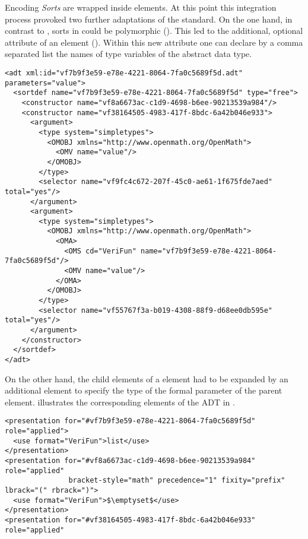 \begin{omgroup}[id=verifun,short=VeriFun,creators={nmueller}]
\begin{omgroup}{Encoding}
{\emph{Sorts}} are wrapped inside {} elements. At this point this integration
process provoked two further adaptations of the {\omdoc} standard. On the one hand, in
contrast to {\omdoc}, sorts in {\verifun} could be polymorphic (). This
led to the additional, optional {} attribute of an
{} element (). Within this new attribute one can declare
by a comma separated list the names of type variables of the abstract data type.
\begin{lstlisting}[label=lst:omdoc:adt,caption={A polymorphic {\omdoc} ADT}]
<adt xml:id="vf7b9f3e59-e78e-4221-8064-7fa0c5689f5d.adt" parameters="value">
  <sortdef name="vf7b9f3e59-e78e-4221-8064-7fa0c5689f5d" type="free">
    <constructor name="vf8a6673ac-c1d9-4698-b6ee-90213539a984"/>
    <constructor name="vf38164505-4983-417f-8bdc-6a42b046e933">
      <argument>
        <type system="simpletypes">
          <OMOBJ xmlns="http://www.openmath.org/OpenMath">
            <OMV name="value"/>
          </OMOBJ>
        </type>
        <selector name="vf9fc4c672-207f-45c0-ae61-1f675fde7aed" total="yes"/>
      </argument>
      <argument>
        <type system="simpletypes">
          <OMOBJ xmlns="http://www.openmath.org/OpenMath">
            <OMA>
              <OMS cd="VeriFun" name="vf7b9f3e59-e78e-4221-8064-7fa0c5689f5d"/>
              <OMV name="value"/>
            </OMA>
          </OMOBJ>
        </type>
        <selector name="vf55767f3a-b019-4308-88f9-d68ee0db595e" total="yes"/>
      </argument>
    </constructor>
  </sortdef>
</adt>
\end{lstlisting}
On the other hand, the child elements of a {} element had to be
expanded by an additional {} element to specify the type of the formal
parameter of the parent {} element. {}
illustrates the corresponding {} elements of the ADT in
{}.
\begin{lstlisting}[escapechar=\%,mathescape,label=lst:omdoc:pres,caption={Representation of {\verifun} names to {\omdoc}}]
<presentation for="#vf7b9f3e59-e78e-4221-8064-7fa0c5689f5d" role="applied">
  <use format="VeriFun">list</use>
</presentation>
<presentation for="#vf8a6673ac-c1d9-4698-b6ee-90213539a984" role="applied"
               bracket-style="math" precedence="1" fixity="prefix" lbrack="(" rbrack=")">
  <use format="VeriFun">$\emptyset$</use>
</presentation>
<presentation for="#vf38164505-4983-417f-8bdc-6a42b046e933" role="applied" 

\end{lstlisting}
\end{omgroup}
\end{omgroup}
